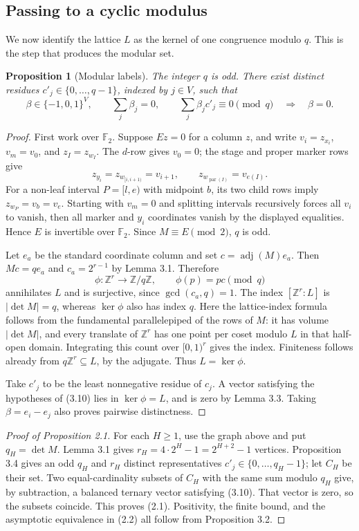 \documentclass[reqno]{amsart}
\newtheorem{proposition}[theorem]{Proposition}
\theoremstyle{remark}
\numberwithin{equation}{section}
\newcommand{\Z}{\mathbb{Z}}
\begin{document}
\subsection{Passing to a cyclic modulus}

We now identify the lattice $L$ as the kernel of one congruence modulo $q$.  This is the step that
produces the modular set.

\begin{proposition}[Modular labels]
The integer $q$ is odd.  There exist distinct residues $c'_j\in\{0,\ldots,q-1\}$, indexed by
$j\in V$, such that
\[
\beta\in\{-1,0,1\}^V,\qquad \sum_j\beta_j=0,\qquad
\sum_j\beta_jc'_j\equiv 0\pmod q
\quad\Longrightarrow\quad \beta=0.
\tag{3.10}
\]
\end{proposition}

\begin{proof}
First work over $\mathbb F_2$.  Suppose $Ez=0$ for a column $z$, and write
$v_i=z_{x_i}$, $v_m=v_0$, and $z_I=z_{w_I}$.  The $d$-row gives $v_0=0$; the stage and
proper marker rows give
\[
z_{y_i}=z_{w_{[i,i+1)}}=v_{i+1},
\qquad z_{w_{\operatorname{par}(I)}}=v_{e(I)}.
\]
For a non-leaf interval $P=[l,e)$ with midpoint $b$, its two child rows imply
$z_{w_P}=v_b=v_e$.  Starting with $v_m=0$ and splitting intervals recursively forces all $v_i$
to vanish, then all marker and $y_i$ coordinates vanish by the displayed equalities.  Hence $E$
is invertible over $\mathbb F_2$.  Since $M\equiv E\pmod 2$, $q$ is odd.

Let $e_a$ be the standard coordinate column and set $c=\operatorname{adj}(M)e_a$.  Then
$Mc=qe_a$ and $c_a=2^{r-1}$ by Lemma 3.1.  Therefore
\[
\phi:\Z^r\longrightarrow\Z/q\Z,
\qquad \phi(p)=pc\pmod q
\]
annihilates $L$ and is surjective, since $\gcd(c_a,q)=1$.  The index $[\Z^r:L]$ is
$|\det M|=q$, whereas $\ker\phi$ also has index $q$.  Here the lattice-index formula follows
from the fundamental parallelepiped of the rows of $M$: it has volume $|\det M|$, and every
translate of $\Z^r$ has one point per coset modulo $L$ in that half-open domain.  Integrating this
count over $[0,1)^r$ gives the index.  Finiteness follows already from $q\Z^r\subseteq L$, by
the adjugate.  Thus $L=\ker\phi$.

Take $c'_j$ to be the least nonnegative residue of $c_j$.  A vector satisfying the hypotheses of
(3.10) lies in $\ker\phi=L$, and is zero by Lemma 3.3.  Taking $\beta=e_i-e_j$ also proves
pairwise distinctness.
\end{proof}

\begin{proof}[Proof of Proposition 2.1]
For each $H\geq 1$, use the graph above and put $q_H=\det M$.  Lemma 3.1 gives
$r_H=4\mathbin{\cdot}2^H-1=2^{H+2}-1$ vertices.  Proposition 3.4 gives an odd $q_H$ and
$r_H$ distinct representatives $c'_j\in\{0,\ldots,q_H-1\}$; let $C_H$ be their set.  Two
equal-cardinality subsets of $C_H$ with the same sum modulo $q_H$ give, by subtraction, a
balanced ternary vector satisfying (3.10).  That vector is zero, so the subsets coincide.  This
proves (2.1).  Positivity, the finite bound, and the asymptotic equivalence in (2.2) all follow
from Proposition 3.2.
\end{proof}
\end{document}
